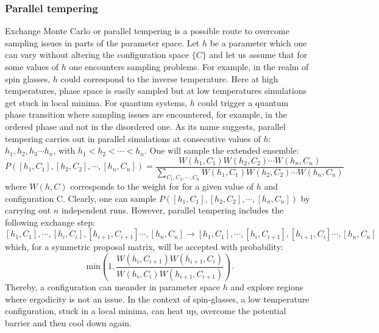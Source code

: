 \subsubsection{Parallel tempering } 
% 
Exchange Monte Carlo \cite{Hukushima96}  or parallel tempering \cite{Greyer91} is a possible route to overcome sampling issues in parts of the parameter space.
Let $h$ be a parameter which one can vary without  altering the configuration space $ \{C  \}  $ and let us assume that for some values of $h$ one encounters sampling problems.   For example, in the realm of spin glasses, $h$  could correspond to the  inverse temperature.  Here at high temperatures,  phase space is easily sampled   but at low temperatures  simulations get stuck in local minima. For quantum systems, $h$ could   trigger a quantum phase transition where  sampling issues are encountered, for example, in the ordered phase and not in the disordered one.   As its name suggests, parallel tempering  carries out in parallel simulations at consecutive  values of  $h$:  $h_1, h_2, h_3   \cdots h_n$, with  $h_{1} < h_2 < \cdots < h_n$.  One will sample the extended ensemble: \begin{equation}
	P(\left[h_1,C_1\right], \left[h_2,C_2\right], \cdots, \left[h_n,C_n\right] ) =  \frac{W(h_1,C_1) W(h_2,C_2) \cdots   W(h_n,C_n) } {\sum_{C_1, C_2, \cdots, C_n} W( h_1,C_1) W( h_2,C_2) \cdots   W(h_n,C_n)}
\end{equation}
where $W(h,C)$ corresponds   to the weight  for  for a given value of $h$ and configuration C. 
Clearly, one can sample  $P( \left[h_1,C_1\right], \left[h_2,C_2\right], \cdots, \left[h_n,C_n\right])$ by carrying out $n$ independent runs.
However, parallel tempering  includes the following   exchange step:
\begin{equation}
	\left[h_1,C_1\right], \cdots, \left[h_i,C_i\right],\left[h_{i+1},C_{i+1}\right] \cdots, \left[h_n,C_n\right]   \rightarrow 
	\left[h_1,C_1\right], \cdots, \left[h_i,C_{i+1}\right],\left[h_{i+1},C_{i}\right] \cdots, \left[h_n,C_n\right] 
\end{equation}
which, for a symmetric proposal matrix, will  be accepted with probability: 
\begin{equation}
	\text{ min} \left( 1,   \frac{ W(h_i,C_{i+1}) W(h_{i+1},C_{i})}{W(h_i,C_{i}) W(h_{i+1},C_{i+1})} \right).
\end{equation}
 Thereby,  a configuration can meander in parameter space $h$ and  explore regions where ergodicity  is not an issue.     In the context of spin-glasses,  a low temperature  configuration, stuck in a local minima, can heat up, overcome the potential  barrier and then cool down again. 
 
